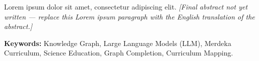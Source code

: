\documentclass[main]{subfiles}
\begin{document}
\noindent Lorem ipsum dolor sit amet, consectetur adipiscing elit. \emph{[Final
abstract not yet written --- replace this Lorem ipsum paragraph with the English
translation of the abstract.]}
\vspace{0.6cm}

\noindent\textbf{Keywords:} Knowledge Graph, Large Language Models (LLM), Merdeka
Curriculum, Science Education, Graph Completion, Curriculum Mapping.
\end{document}
